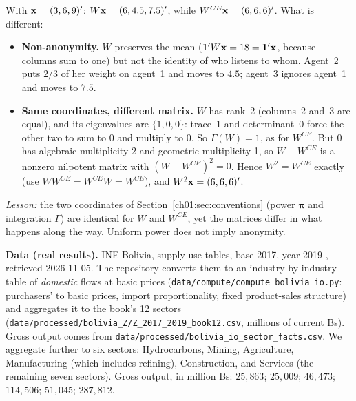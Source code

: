 \documentclass[../solutions_manual.tex]{subfiles}
\begin{document}
With $\mathbf{x} = (3, 6, 9)'$: $W\mathbf{x} = (6, 4.5, 7.5)'$, while $W^{CE}\mathbf{x} = (6, 6, 6)'$. What is different:
\begin{itemize}
\item \textbf{Non-anonymity.} $W$ preserves the mean ($\mathbf{1}'W\mathbf{x} = 18 = \mathbf{1}'\mathbf{x}$, because columns sum to one) but not the identity of who listens to whom. Agent~2 puts $2/3$ of her weight on agent~1 and moves to $4.5$; agent~3 ignores agent~1 and moves to $7.5$.
\item \textbf{Same coordinates, different matrix.} $W$ has rank~2 (columns~2 and~3 are equal), and its eigenvalues are $\{1, 0, 0\}$: trace~1 and determinant~0 force the other two to sum to 0 and multiply to 0. So $\Gamma(W) = 1$, as for $W^{CE}$. But $0$ has algebraic multiplicity 2 and geometric multiplicity 1, so $W - W^{CE}$ is a nonzero nilpotent matrix with $(W - W^{CE})^2 = 0$. Hence $W^2 = W^{CE}$ exactly (use $WW^{CE} = W^{CE}W = W^{CE}$), and $W^2\mathbf{x} = (6,6,6)'$.
\end{itemize}
\emph{Lesson:} the two coordinates of Section~\ref{ch01:sec:conventions} (power $\boldsymbol\pi$ and integration $\Gamma$) are identical for $W$ and $W^{CE}$, yet the matrices differ in what happens along the way. Uniform power does not imply anonymity.


\textbf{Data (real results).} INE Bolivia, supply-use tables, base 2017, year 2019 \citep{ine2026sut}, retrieved 2026-11-05. The repository converts them to an industry-by-industry table of \emph{domestic} flows at basic prices (\texttt{data/compute/compute\_bolivia\_io.py}: purchasers' to basic prices, import proportionality, fixed product-sales structure) and aggregates it to the book's 12 sectors (\texttt{data/processed/bolivia\_Z/Z\_2017\_2019\_book12.csv}, millions of current Bs). Gross output comes from \texttt{data/processed/bolivia\_io\_sector\_facts.csv}. We aggregate further to six sectors: Hydrocarbons, Mining, Agriculture, Manufacturing (which includes refining), Construction, and Services (the remaining seven sectors). Gross output, in million Bs: $25{,}863$; $25{,}009$; $46{,}473$; $114{,}506$; $51{,}045$; $287{,}812$.
\end{document}
